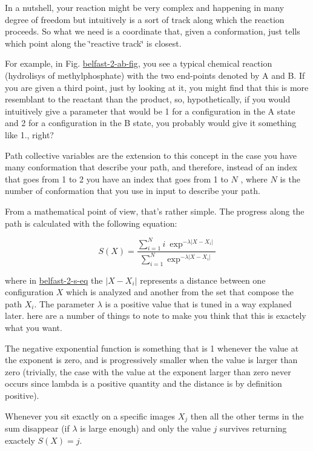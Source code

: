 In a nutshell, your reaction might be very complex and happening in many degree of freedom but intuitively is a sort of track along which the reaction proceeds. So what we need is a coordinate that, given a conformation, just tells which point along the \char`\"{}reactive track\char`\"{} is closest.

\label{belfast-2_belfast-2-ab-fig}%
\hypertarget{belfast-2_belfast-2-ab-fig}{}%


For example, in Fig. \hyperlink{belfast-2_belfast-2-ab-fig}{belfast-\/2-\/ab-\/fig}, you see a typical chemical reaction (hydrolisys of methylphosphate) with the two end-\/points denoted by A and B. If you are given a third point, just by looking at it, you might find that this is more resemblant to the reactant than the product, so, hypothetically, if you would intuitively give a parameter that would be 1 for a configuration in the A state and 2 for a configuration in the B state, you probably would give it something like 1., right?

Path collective variables are the extension to this concept in the case you have many conformation that describe your path, and therefore, instead of an index that goes from 1 to 2 you have an index that goes from 1 to $N$ , where $N$ is the number of conformation that you use in input to describe your path.

From a mathematical point of view, that's rather simple. The progress along the path is calculated with the following equation\+:

\label{belfast-2_belfast-2-s-eq}%
\hypertarget{belfast-2_belfast-2-s-eq}{}%
 \[ S(X)=\frac{\sum_{i=1}^{N} i\ \exp^{-\lambda \vert X-X_i \vert }}{ \sum_{i=1}^{N} \exp^{-\lambda \vert X-X_i \vert } } \]

where in \hyperlink{belfast-2_belfast-2-s-eq}{belfast-\/2-\/s-\/eq} the $ \vert X-X_i \vert $ represents a distance between one configuration $ X $ which is analyzed and another from the set that compose the path $ X_i $. The parameter $ \lambda $ is a positive value that is tuned in a way explaned later. here are a number of things to note to make you think that this is exactely what you want.
\begin{DoxyItemize}
\item The negative exponential function is something that is 1 whenever the value at the exponent is zero, and is progressively smaller when the value is larger than zero (trivially, the case with the value at the exponent larger than zero never occurs since lambda is a positive quantity and the distance is by definition positive).
\item Whenever you sit exactly on a specific images $ X_j $ then all the other terms in the sum disappear (if $ \lambda $ is large enough) and only the value $ j $ survives returning exactely $ S(X)=j $.
\end{DoxyItemize}


